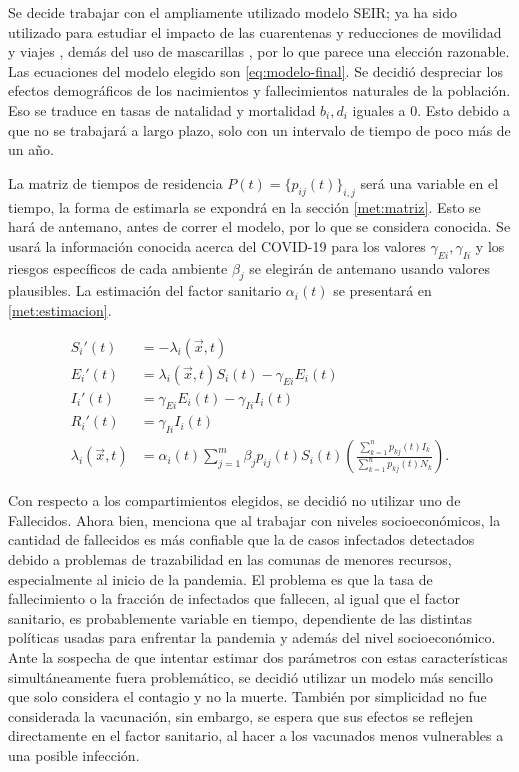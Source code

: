 Se decide trabajar con el ampliamente utilizado modelo SEIR; ya ha sido utilizado para estudiar el impacto de las cuarentenas y reducciones de movilidad y viajes \cite{Lai2020}\cite{Chinazzi2020}, demás del uso de mascarillas \cite{Kai2020}, por lo que parece una elección razonable. Las ecuaciones del modelo elegido son \ref{eq:modelo-final}. Se decidió despreciar los efectos demográficos de los nacimientos y fallecimientos naturales de la población. Eso se traduce en tasas de natalidad y mortalidad \(b_i, d_i\) iguales a 0. Esto debido a que no se trabajará a largo plazo, solo con un intervalo de tiempo de poco más de un año.

La matriz de tiempos de residencia \(P(t) = \{p_{ij}(t)\}_{i,j}\) será una variable en el tiempo, la forma de estimarla se expondrá en la sección \ref{met:matriz}. Esto se hará de antemano, antes de correr el modelo, por lo que se considera conocida. Se usará la información conocida acerca del COVID-19 para los valores \(\gamma_{Ei}, \gamma_{Ii}\) y los riesgos específicos de cada ambiente \(\beta_j\) se elegirán de antemano usando valores plausibles. La estimación del factor sanitario \(\alpha_i(t)\) se presentará en \ref{met:estimacion}.

\begin{equation}\label{eq:modelo-final}
\begin{aligned}
S_i'(t) &= - \lambda_i(\vec{x}, t)\\
E_i'(t) &= \lambda_i(\vec{x}, t) S_i(t)  - \gamma_{Ei} E_i(t) \\ 
I_i'(t) &= \gamma_{Ei} E_i(t)  - \gamma_{Ii} I_i(t) \\ 
R_i'(t) &= \gamma_{Ii} I_i(t) \\
\lambda_i(\vec{x}, t) &= \alpha_i(t)\sum_{j=1}^m \beta_{j}p_{ij}(t) S_i(t) \left(\frac{\sum_{k=1}^{n}p_{kj}(t) I_k}{\sum_{k=1}^{n}p_{kj}(t)N_k}\right).
\end{aligned}
\end{equation}

Con respecto a los compartimientos elegidos, se decidió no utilizar uno de Fallecidos. Ahora bien, \cite{Mena2021} menciona que al trabajar con niveles socioeconómicos, la cantidad de fallecidos es más confiable que la de casos infectados detectados debido a problemas de trazabilidad en las comunas de menores recursos, especialmente al inicio de la pandemia. El problema es que la tasa de fallecimiento o la fracción de infectados que fallecen, al igual que el factor sanitario, es probablemente variable en tiempo, dependiente de las distintas políticas usadas para enfrentar la pandemia y además del nivel socioeconómico. Ante la sospecha de que intentar estimar dos parámetros con estas características simultáneamente fuera problemático, se decidió utilizar un modelo más sencillo que solo considera el contagio y no la muerte. También por simplicidad no fue considerada la vacunación, sin embargo, se espera que sus efectos se reflejen directamente en el factor sanitario, al hacer a los vacunados menos vulnerables a una posible infección.


